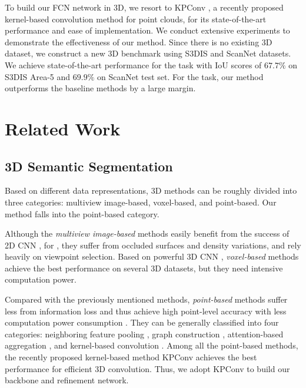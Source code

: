 \documentclass[runningheads]{llncs}
\begin{document}
{To build our FCN network in 3D, we resort to KPConv \cite{thomas2019kpconv}, a recently proposed kernel-based convolution method for point clouds, for its state-of-the-art performance and ease of implementation.
We conduct extensive experiments to demonstrate the {effectiveness of our method.} Since there is no existing 3D {\SemEdgeD} dataset, we construct a new 3D {\SemEdgeD} benchmark using S3DIS \cite{armeni_cvpr16} and ScanNet \cite{dai2017scannet} datasets. We achieve state-of-the-art performance for the {\SemSeg} task with IoU scores of $67.7\%$ on S3DIS Area-5 and $69.9\%$ on ScanNet test set. For the {\SemEdgeD} task, {our method} outperforms the baseline methods by a large margin.}


%
 
\section{Related Work}

\subsection{3D Semantic Segmentation}

Based on different data representations, 3D {\SemSeg} methods can be roughly divided into three categories: multiview image-based, voxel-based, and point-based. Our method falls into the point-based category.


Although the \emph{multiview image-based} methods
{easily}
benefit from 
the success of 2D CNN \cite{boulch2017unstructured,lawin2017deep}, for {\SemSeg}, they suffer from occluded surfaces {and} density variations{,} and rely heavily on viewpoint selection. 
{Based on}
powerful 3D CNN \cite{roynard2018classification,ben20183dmfv,le2018pointgrid,meng2018vvnet,riegler2017octnet,graham20183d,Choy_2019}, \emph{voxel-based} methods achieve the best performance on several 3D {\SemSeg} datasets, but {they need intensive computation power}.


{{Compared}
with the previously mentioned methods, \emph{point-based} methods suffer less from information loss and {thus} achieve high point-level accuracy with less computation power consumption \cite{qi2017pointnet,qi2017pointnet++}.}
They can be generally classified into four categories:  neighboring feature pooling \cite{li2018so,Huang_2018,zhao2019pointweb,zhang2019shellnet}, graph construction \cite{wang2019dynamic,wang2019graph,jiang2019hierarchical,liu2019dynamic}, attention-based aggregation \cite{xie2018attentional}{,} and kernel-based convolution \cite{Su_2018,hua2018pointwise,wu2019pointconv,Lei_2019,Komarichev_2019,Lan_2019,mao2019interpolated,thomas2019kpconv}. {Among all the point-based methods, the recently proposed kernel-based method KPConv \cite{thomas2019kpconv}
achieves the best performance for efficient 3D convolution. Thus, we adopt KPConv
to build our backbone and refinement network.}
\end{document}
